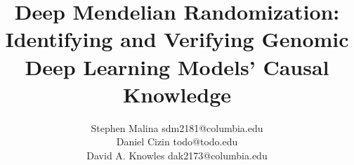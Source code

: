 \documentclass[twoside,11pt]{article}
\begin{document}
\title{Deep Mendelian Randomization: Identifying and Verifying Genomic Deep Learning Models' Causal Knowledge}

\author{\name Stephen Malina \email sdm2181@columbia.edu \\
       \AND
       \name Daniel Cizin \email todo@todo.edu \\
       \AND
       \name David A. Knowles \email dak2173@columbia.edu}
       


\maketitle








\newpage

\appendix


\vskip 0.2in

\end{document}
